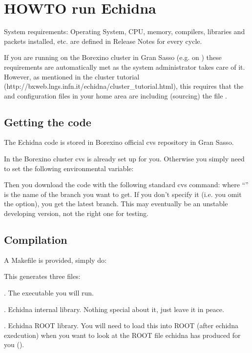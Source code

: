 \section{HOWTO run Echidna}
\label{sec:run}

System requirements: Operating System, CPU, memory, compilers, libraries and packets installed, etc. are defined in Release Notes for every cycle. 

If you are running on the Borexino cluster in Gran Sasso (e.g. on ) these requirements are automatically met as the system administrator takes care of it.
However, as mentioned in the cluster tutorial (http://bxweb.lngs.infn.it/echidna/cluster\_tutorial.html), 
this requires that the  and  configuration files in your home area are including (sourcing) the file .


\subsection{Getting the code}
\label{sec:run_get}

The Echidna code is stored in Borexino official cvs repository in Gran Sasso.

In the Borexino cluster cvs is already set up for you.
Otherwise you simply need to set the following environmental variable:

Then you download the code with the following standard cvs command:
where ``'' is the name of the branch you want to get.
If you don't specify it (i.e. you omit the  option), you get the latest branch.
This may eventually be an unstable developing version, not the right one for testing.


\subsection{Compilation}
\label{sec:run_make}

A Makefile is provided, simply do:

This generates three files:
\bde
\item[\code{echidna}]. The executable you will run.
\item[\code{libechinda.so}]. Echidna internal library. 
  Nothing special about it, just leave it in peace.
\item[\code{root/rootechidna.so}]. Echidna ROOT library. 
  You will need to load this into ROOT (after echidna exedcution) when you want to look at the ROOT file echidna has produced for you (). 
\ede


